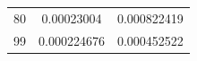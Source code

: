 \documentclass{jreport}		%
\begin{document}
\begin{table}
\begin{center}
\begin{tabular}{c|cc}
80&0.00023004&0.000822419 \\
99&0.000224676&0.000452522 \\ \hline
  \end{tabular}
  \end{center}
\end{table}
\end{document}
